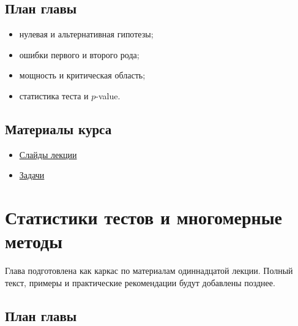 \documentclass[
  russian,
  12pt,
  a4paper,
  a4paper,
  openany]{scrbook}
\providecommand{\tightlist}{%
  \setlength{\itemsep}{0pt}\setlength{\parskip}{0pt}}
\begin{document}
\section{План
главы}\label{ux43fux43bux430ux43d-ux433ux43bux430ux432ux44b-8}

\begin{itemize}
\tightlist
\item
  нулевая и альтернативная гипотезы;
\item
  ошибки первого и второго рода;
\item
  мощность и критическая область;
\item
  статистика теста и \(p\)-value.
\end{itemize}

\section{Материалы
курса}\label{ux43cux430ux442ux435ux440ux438ux430ux43bux44b-ux43aux443ux440ux441ux430-7}

\begin{itemize}
\tightlist
\item
  \href{https://neutrinohit.github.io/statistical-analysis-course/ru/slides/09_statistical_tests_basics.html}{Слайды
  лекции}
\item
  \href{https://neutrinohit.github.io/statistical-analysis-course/ru/slides/exercises/09_statistical_tests_basics_exercises.html}{Задачи}
\end{itemize}

\chapter{Статистики тестов и многомерные
методы}\label{ux441ux442ux430ux442ux438ux441ux442ux438ux43aux438-ux442ux435ux441ux442ux43eux432-ux438-ux43cux43dux43eux433ux43eux43cux435ux440ux43dux44bux435-ux43cux435ux442ux43eux434ux44b}

\begin{bookchapteropening}

Глава подготовлена как каркас по материалам одиннадцатой лекции. Полный
текст, примеры и практические рекомендации будут добавлены позднее.

\end{bookchapteropening}

\section{План
главы}\label{ux43fux43bux430ux43d-ux433ux43bux430ux432ux44b-9}
\end{document}
